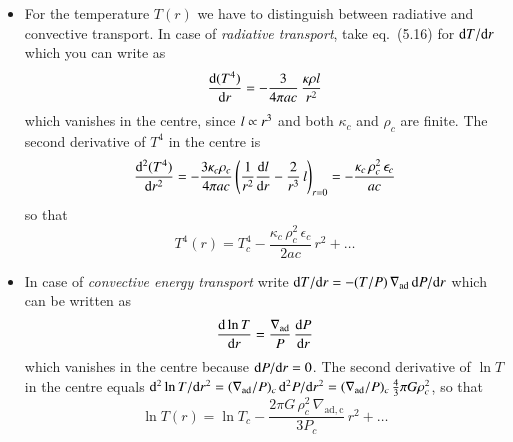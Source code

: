 \documentclass[11pt,a4paper,fleqn]{report}
\begin{document}
\begin{enumerate}
\begin{enumerate}
\begin {itemize}
    \item For the temperature $T(r)$ we have to distinguish between
      radiative and convective transport.  In case of \emph{radiative
        transport}, take eq.~(5.16) for $\mathrm{d} T/\mathrm{d} r$ which you can
      write as
      \[
      \frac{\mathrm{d} (T^4)}{\mathrm{d} r} = 
      -\frac{3}{4\pi a c}\,\frac{\kappa\rho l}{r^2}
      \]
      which vanishes in the centre, since $l \propto r^3$ and both
      $\kappa_c$ and $\rho_c$ are finite. The second derivative of
      $T^4$ in the centre is
      \[
      \frac{\mathrm{d}^2 (T^4)}{\mathrm{d} r^2} = -\frac{3\kappa_c\rho_c}{4\pi a c}\,
      \Bigg(\frac{1}{r^2}\frac{\mathrm{d}l}{\mathrm{d} r} 
      - \frac{2}{r^3}\,l \Bigg)_{r=0}
      = -\frac{\kappa_c\,\rho_c^2\,\epsilon_c}{ac}
      \]
      so that
      \[
      T^4(r) = T_c^4 - \frac{\kappa_c\, \rho_c^2\,
        \epsilon_c}{2ac}\,r^2 + \ldots
      \]
      
    \item In case of \emph{convective energy transport} write $\mathrm{d}
      T/\mathrm{d} r = -(T/P) \, {\nabla_\mathrm{ad}}\, \mathrm{d} P/\mathrm{d} r$ which can be
      written as
      \[
      \frac{\mathrm{d}\ln T}{\mathrm{d} r} = \frac{{\nabla_\mathrm{ad}}}{P}\,\frac{\mathrm{d} P}{\mathrm{d} r}
      \]
      which vanishes in the centre because $\mathrm{d} P/\mathrm{d} r = 0$. The
      second derivative of $\ln T$ in the centre equals $\mathrm{d}^2 \ln
      T/\mathrm{d} r^2 = ({\nabla_\mathrm{ad}}/P)_c\,\mathrm{d}^2 P/\mathrm{d} r^2 = ({\nabla_\mathrm{ad}}/P)_c\,
      \frac{4}{3}\pi G \rho_c^2$, so that
      \[
      \ln T(r) = \ln T_c - \frac{2\pi G\, \rho_c^2\,
        \nabla_\mathrm{ad,c}}{3 P_c}\,r^2 + \ldots
      \]

    \end{itemize}

  \end{enumerate}

\end{enumerate}
\end{document}
